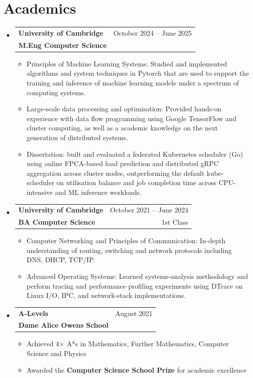 \documentclass[a4paper,11pt]{article}
\makeatletter
\newcommand{\resumeItem}[2]{
  \item[--]
    \textbf{#1}{#2 \vspace{-2pt}}
  }
\newcommand{\resumeSubheading}[4]{
  \vspace{-1pt}\item
    \begin{tabular*}{0.97\textwidth}{l@{\extracolsep{\fill}}r}
      \textbf{#1} & \small{#2} \\
      \textbf{#3} &  \small{#4} \\
    \end{tabular*}\vspace{-5pt}
}
\newcommand{\resumeSubHeadingListStart}{\begin{itemize}[leftmargin=*]}
\newcommand{\resumeSubHeadingListEnd}{\end{itemize}\vspace{-0.4cm}}
\newcommand{\resumeItemListStart}{\begin{itemize}
    [labelsep=1ex, itemindent=0em, leftmargin=1em
    ]}
\newcommand{\resumeItemListEnd}{\end{itemize}\vspace{-5pt}}
\makeatother
\begin{document}
\section{Academics}
 {\renewcommand\labelitemi{}

  \resumeSubHeadingListStart

  \resumeSubheading
  {University of Cambridge}{October 2024 -- June 2025}
  {M.Eng Computer Science}{}
  \resumeItemListStart
  \resumeItem{}{Principles of Machine Learning Systems: Studied and
	  implemented algorithms and system techniques in Pytorch that are used to
	  support the training and inference of machine learning models under a
	  spectrum of computing systems.}
  \resumeItem{}{Large-scale data processing and optimisation: Provided
	  hands-on experience with data flow programming using Google TensorFlow and
	  cluster computing, as well as a academic knowledge on the next generation of
	  distributed systems.}
  \resumeItem{}{Dissertation: built and evaluated a federated Kubernetes
	  scheduler (Go) using online FPCA-based load prediction and distributed
	  gRPC aggregation across cluster nodes, outperforming the default
	  kube-scheduler on utilisation balance and job completion time across
	  CPU-intensive and ML inference workloads.}
  \resumeItemListEnd

  \resumeSubheading
  {University of Cambridge}{October 2021 -- June 2024}
  {BA Computer Science}{1st Class}
  \resumeItemListStart
  \resumeItem{}{Computer Networking and Principles of Communication: In-depth
	  understanding of routing, switching and network protocols including DNS,
	  DHCP, TCP/IP.}
  \resumeItem{}{Advanced Operating Systems: Learned systems-analysis methodology
	  and perform tracing and performance profiling experiments using DTrace on
	  Linux I/O, IPC, and network-stack implementations.}
  \resumeItemListEnd

  \resumeSubheading
  {A-Levels}{August 2021}
  {Dame Alice Owens School}{}
  \resumeItemListStart
  \resumeItem{}{Achieved 4$\times$ A*s in Mathematics, Further Mathematics,
	  Computer Science and Physics}
  \resumeItem{}{Awarded the \textbf{Computer Science School Prize} for
	  academic excellence}
  \resumeItemListEnd

  \resumeSubHeadingListEnd

  \vspace{-0.2cm}
}
\end{document}
